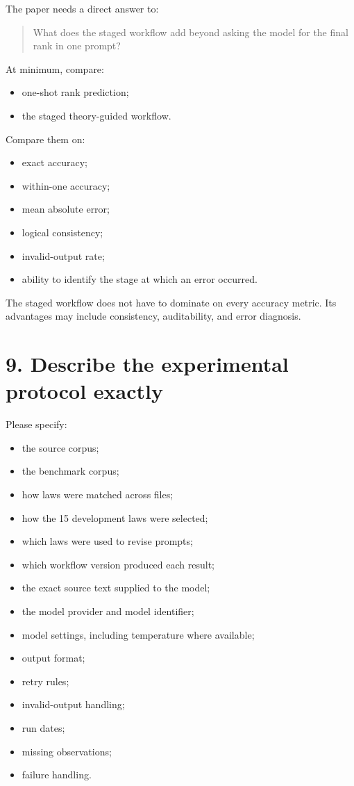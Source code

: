 \documentclass[11pt]{article}
\begin{document}
The paper needs a direct answer to:

\begin{quote}
What does the staged workflow add beyond asking the model for the final rank in one prompt?
\end{quote}

At minimum, compare:

\begin{itemize}
    \item one-shot rank prediction;
    \item the staged theory-guided workflow.
\end{itemize}

Compare them on:

\begin{itemize}
    \item exact accuracy;
    \item within-one accuracy;
    \item mean absolute error;
    \item logical consistency;
    \item invalid-output rate;
    \item ability to identify the stage at which an error occurred.
\end{itemize}

The staged workflow does not have to dominate on every accuracy metric. Its advantages may include consistency, auditability, and error diagnosis.

\section*{9. Describe the experimental protocol exactly}

Please specify:

\begin{itemize}
    \item the source corpus;
    \item the benchmark corpus;
    \item how laws were matched across files;
    \item how the 15 development laws were selected;
    \item which laws were used to revise prompts;
    \item which workflow version produced each result;
    \item the exact source text supplied to the model;
    \item the model provider and model identifier;
    \item model settings, including temperature where available;
    \item output format;
    \item retry rules;
    \item invalid-output handling;
    \item run dates;
    \item missing observations;
    \item failure handling.
\end{itemize}
\end{document}
